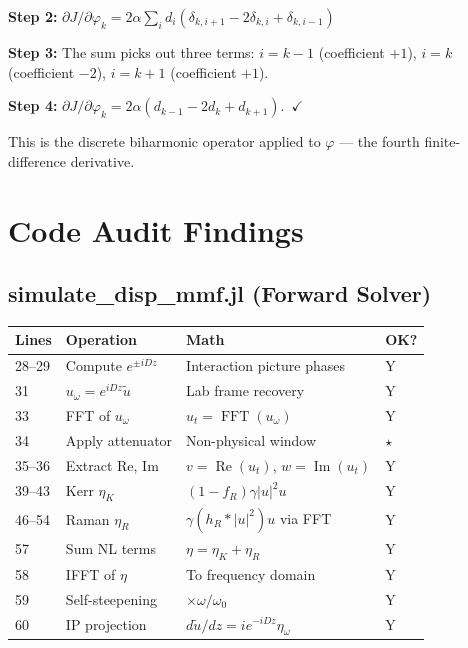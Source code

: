 \documentclass[12pt,a4paper]{article}
\newcommand{\Real}{\operatorname{Re}}
\newcommand{\Imag}{\operatorname{Im}}
\newcommand{\FFT}{\operatorname{FFT}}
\theoremstyle{definition}
\begin{document}
\textbf{Step 2:} $\partial J/\partial\varphi_k = 2\alpha\sum_i d_i(\delta_{k,i+1} - 2\delta_{k,i} + \delta_{k,i-1})$

\textbf{Step 3:} The sum picks out three terms: $i=k-1$ (coefficient $+1$), $i=k$ (coefficient $-2$), $i=k+1$ (coefficient $+1$).

\textbf{Step 4:} $\partial J/\partial\varphi_k = 2\alpha(d_{k-1} - 2d_k + d_{k+1})$.~$\checkmark$

This is the discrete biharmonic operator applied to $\varphi$ --- the fourth finite-difference derivative.


\section{Code Audit Findings}
\label{app:code_audit}

\subsection{simulate\_disp\_mmf.jl (Forward Solver)}

\begin{center}
\begin{tabular}{p{1.5cm}p{4cm}p{3cm}p{1cm}}
\toprule
\textbf{Lines} & \textbf{Operation} & \textbf{Math} & \textbf{OK?} \\
\midrule
28--29 & Compute $e^{\pm iDz}$ & Interaction picture phases & Y \\
31 & $u_\omega = e^{iDz}\tilde{u}$ & Lab frame recovery & Y \\
33 & FFT of $u_\omega$ & $u_t = \FFT(u_\omega)$ & Y \\
34 & Apply attenuator & Non-physical window & $\star$ \\
35--36 & Extract Re, Im & $v = \Real(u_t)$, $w = \Imag(u_t)$ & Y \\
39--43 & Kerr $\eta_K$ & $(1-f_R)\gamma|u|^2 u$ & Y \\
46--54 & Raman $\eta_R$ & $\gamma(h_R*|u|^2)u$ via FFT & Y \\
57 & Sum NL terms & $\eta = \eta_K + \eta_R$ & Y \\
58 & IFFT of $\eta$ & To frequency domain & Y \\
59 & Self-steepening & $\times\omega/\omega_0$ & Y \\
60 & IP projection & $d\tilde{u}/dz = ie^{-iDz}\eta_\omega$ & Y \\
\bottomrule
\end{tabular}
\end{center}
\end{document}
